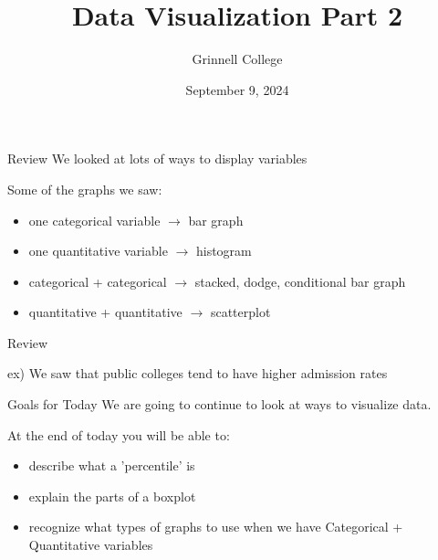 \documentclass{beamer}
\title[STA-209]{Data Visualization Part 2}
\subtitle{}
\author{Grinnell College}
\date{September 9, 2024}
\begin{document}
\begin{frame}
  \titlepage
\end{frame}

\begin{frame}{Review}
We looked at lots of ways to display variables \vspace{4mm}

Some of the graphs we saw:
\begin{itemize}
    \item one categorical variable $\rightarrow$ bar graph
    \item one quantitative variable $\rightarrow$ histogram
    \item categorical + categorical $\rightarrow$ stacked, dodge, conditional bar graph
    \item quantitative + quantitative $\rightarrow$ scatterplot
\end{itemize}
\end{frame}

\begin{frame}{Review}
 \vspace{2mm}

ex) We saw that public colleges tend to have higher admission rates \vspace{12mm}

 \vspace{2mm}
\end{frame}


\begin{frame}{Goals for Today}
We are going to continue to look at ways to visualize data. \vspace{5mm}

At the end of today you will be able to:
\begin{itemize}
    \item describe what a 'percentile' is
    \item explain the parts of a boxplot
    \item recognize what types of graphs to use when we have \hspace{10mm} Categorical + Quantitative variables
\end{itemize}
\end{frame}
\end{document}
